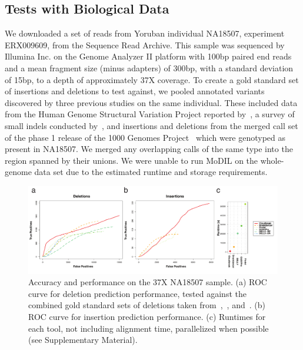 \documentclass{bioinfo}
\begin{document}
\subsection{Tests with Biological Data}

We downloaded a set of reads from Yoruban individual NA18507, experiment ERX009609, from the Sequence Read Archive. This sample was sequenced by Illumina Inc. on the Genome Analyzer II platform with 100bp paired end reads and a mean fragment size (minus adapters) of 300bp, with a standard deviation of 15bp, to a depth of approximately 37X coverage. To create a gold standard set of insertions and deletions to test against, we pooled annotated variants discovered by three previous studies on the same individual. These included data from the Human Genome Structural Variation Project reported by~\cite{Kidd:2008p926}, a survey of small indels conducted by~\cite{Mills:2011fi}, and insertions and deletions from the merged call set of the phase 1 release of the 1000 Genomes Project~\citep{GenomesProjectConsortium:2012co} which were genotyped as present in NA18507. We merged any overlapping calls of the same type into the region spanned by their unions. We were unable to run MoDIL on the whole-genome data set due to the estimated runtime and storage requirements.

\begin{figure}
\centering
\includegraphics[width=1\textwidth]{NA18507_rocs_runtimes_journal.pdf}
\caption{Accuracy and performance on the 37X NA18507 sample. (a) ROC curve for deletion prediction performance, tested against the combined gold standard sets of deletions taken from~\cite{Kidd:2008p926},~\cite{Mills:2011fi}, and~\cite{GenomesProjectConsortium:2012co}. (b) ROC curve for insertion prediction performance. (c) Runtimes for each tool, not including alignment time, parallelized when possible (see Supplementary Material). }
\label{NA18507CombinedRoc}
\end{figure}
\end{document}

